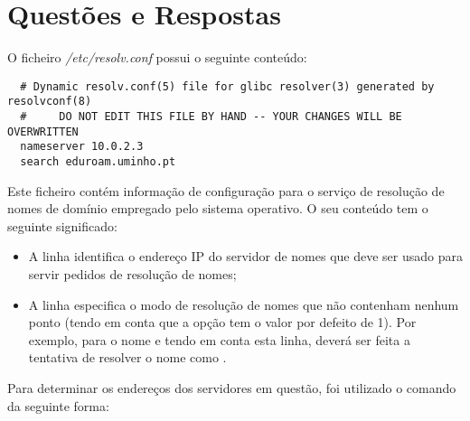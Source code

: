 
\section{Questões e Respostas}
\label{sec:respostas}



\noindent O ficheiro \emph{/etc/resolv.conf} possui o seguinte conteúdo:

\begin{verbatim}
  # Dynamic resolv.conf(5) file for glibc resolver(3) generated by resolvconf(8)
  #     DO NOT EDIT THIS FILE BY HAND -- YOUR CHANGES WILL BE OVERWRITTEN
  nameserver 10.0.2.3
  search eduroam.uminho.pt
\end{verbatim}

Este ficheiro contém informação de configuração para o serviço de resolução de nomes de domínio empregado pelo sistema operativo. O seu conteúdo tem o seguinte significado:

\begin{itemize}

    \item A linha  identifica o endereço IP do servidor de nomes que deve ser usado para servir pedidos de resolução de nomes;

    \item A linha  especifica o modo de resolução de nomes que não contenham nenhum ponto (tendo em conta que a opção  tem o valor por defeito de 1). Por exemplo, para o nome  e tendo em conta esta linha, deverá ser feita a tentativa de resolver o nome como .

\end{itemize}



\noindent Para determinar os endereços dos servidores em questão, foi utilizado o comando  da seguinte forma:

